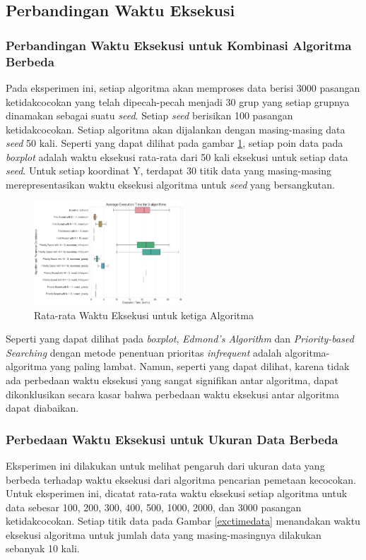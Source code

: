 \documentclass[conference]{IEEEtran}
\begin{document}
\subsection{Perbandingan Waktu Eksekusi}
\subsubsection{Perbandingan Waktu Eksekusi untuk Kombinasi Algoritma Berbeda}
Pada eksperimen ini, setiap algoritma akan memproses data berisi 3000 pasangan ketidakcocokan yang telah dipecah-pecah menjadi 30
grup yang setiap grupnya dinamakan sebagai suatu \textit{seed}. Setiap \textit{seed} berisikan 100 pasangan ketidakcocokan. Setiap
algoritma akan dijalankan dengan masing-masing data \textit{seed} 50 kali. Seperti yang dapat dilihat pada gambar \ref{exctimealgo},
setiap poin data pada \textit{boxplot} adalah waktu eksekusi rata-rata dari 50 kali eksekusi untuk setiap data \textit{seed}. Untuk
setiap koordinat Y, terdapat 30 titik data yang masing-masing merepresentasikan waktu eksekusi algoritma untuk \textit{seed} yang bersangkutan. 

\begin{figure}[h]
    \includegraphics[width=0.5\textwidth]{images/average_execution_time_for_3_algorithms.png}
    \caption{Rata-rata Waktu Eksekusi untuk ketiga Algoritma}
    \label{exctimealgo}
\end{figure}

Seperti yang dapat dilihat pada \textit{boxplot}, \textit{Edmond's Algorithm} dan \textit{Priority-based Searching} dengan
metode penentuan prioritas \textit{infrequent} adalah algoritma-algoritma yang paling lambat. Namun, seperti yang dapat dilihat,
karena tidak ada perbedaan waktu eksekusi yang sangat signifikan antar algoritma, dapat dikonklusikan secara kasar bahwa
perbedaan waktu eksekusi antar algoritma dapat diabaikan.

\subsubsection{Perbedaan Waktu Eksekusi untuk Ukuran Data Berbeda}
Eksperimen ini dilakukan untuk melihat pengaruh dari ukuran data yang berbeda terhadap waktu eksekusi dari algoritma pencarian
pemetaan kecocokan. Untuk eksperimen ini, dicatat rata-rata waktu eksekusi setiap algoritma untuk data sebesar 100, 200,
300, 400, 500, 1000, 2000, dan 3000 pasangan ketidakcocokan. Setiap titik data pada Gambar \ref{exctimedata} menandakan waktu
eksekusi algoritma untuk jumlah data yang masing-masingnya dilakukan sebanyak 10 kali.
\end{document}
